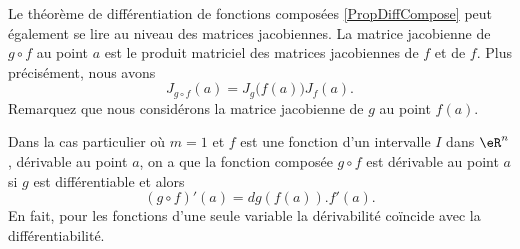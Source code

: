 \begin{normaltext}
	Le théorème de différentiation de fonctions composées \ref{PropDiffCompose} peut également se lire au niveau des matrices jacobiennes. La matrice jacobienne de $g\circ f$ au point $a$ est le produit matriciel des matrices jacobiennes de $f$ et de $f$. Plus précisément, nous avons
	\begin{equation}
		J_{g\circ f}(a)=J_g\big( f(a) \big)J_f(a).
	\end{equation}
	Remarquez que nous considérons la matrice jacobienne de $g$ au point $f(a)$.

	Dans la cas particulier où $m=1$ et $f$ est une fonction d'un intervalle $I$ dans $\eR^n$, dérivable au point $a$, on a que la fonction composée $g\circ f$ est dérivable au point $a$ si $g$ est différentiable et alors
	\[
		(g\circ f)'(a)= dg\left(f(a)\right).f'(a).
	\]
	En fait, pour les fonctions d'une seule variable la dérivabilité coïncide avec la différentiabilité.
\end{normaltext}

